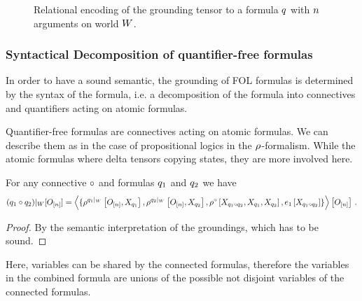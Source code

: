 \begin{figure}[h]
	\begin{center}
		
	\end{center}
	\caption{Relational encoding of the grounding tensor to a formula $q$ with $n$ arguments on world $W$. }
	\label{fig:groundingTensor}
\end{figure}



\subsubsection{Syntactical Decomposition of quantifier-free formulas}

In order to have a sound semantic, the grounding of FOL formulas is determined by the syntax of the formula, i.e. a decomposition of the formula into connectives and quantifiers acting on atomic formulas.

Quantifier-free formulas are connectives acting on atomic formulas.
We can describe them as in the case of propositional logics in the $\rho^{}$-formalism.
While the atomic formulas where delta tensors copying states, they are more involved here.



\begin{theorem}
	For any connective $\circ$ and formulas $q_1$ and $q_2$ we have
	\begin{align}
		{(q_1\circ q_2)}|_{W}[O_{[n]}] = 
			\left\langle \{
			\rho^{{q_1}|_{W}}\left[O_{[n]},X_{q_1}\right],
			\rho^{{q_2}|_{W}}\left[O_{[n]},X_{q_2}\right],
			\rho^{\circ}\left[X_{q_1\circ q_2}, X_{q_1}, X_{q_2}\right], 
			e_{1}\left[X_{q_1\circ q_2}\right]			
			\}\right\rangle \left[ O_{[n]} \right] \, . 
	\end{align}
\end{theorem}
\begin{proof}
	By the semantic interpretation of the groundings, which has to be sound.
\end{proof}

Here, variables can be shared by the connected formulas, therefore the variables in the combined formula are unions of the possible not disjoint variables of the connected formulas.

